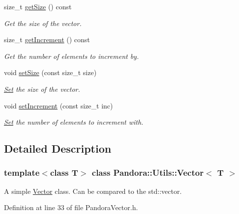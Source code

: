 \begin{DoxyCompactItemize}
size\_\-t \hyperlink{classPandora_1_1Utils_1_1Vector_a8df1cb3c4cc21dca4b093eed28c62b9a}{getSize} () const 
\begin{DoxyCompactList}\small\item\em Get the size of the vector. \item\end{DoxyCompactList}\item 
size\_\-t \hyperlink{classPandora_1_1Utils_1_1Vector_aee155c4f9a304e540e359af6d3fec3d8}{getIncrement} () const 
\begin{DoxyCompactList}\small\item\em Get the number of elements to increment by. \item\end{DoxyCompactList}\item 
void \hyperlink{classPandora_1_1Utils_1_1Vector_adc9658f8a19f67e7e92b43c5bd4206c7}{setSize} (const size\_\-t size)
\begin{DoxyCompactList}\small\item\em \hyperlink{classPandora_1_1Utils_1_1Set}{Set} the size of the vector. \item\end{DoxyCompactList}\item 
void \hyperlink{classPandora_1_1Utils_1_1Vector_a7712e06b6660e77796a6d4093d949e8e}{setIncrement} (const size\_\-t inc)
\begin{DoxyCompactList}\small\item\em \hyperlink{classPandora_1_1Utils_1_1Set}{Set} the number of elements to increment with. \item\end{DoxyCompactList}\end{DoxyCompactItemize}


\subsection{Detailed Description}
\subsubsection*{template$<$class T$>$ class Pandora::Utils::Vector$<$ T $>$}

A simple \hyperlink{classPandora_1_1Utils_1_1Vector}{Vector} class. Can be compared to the std::vector. 

Definition at line 33 of file PandoraVector.h.

